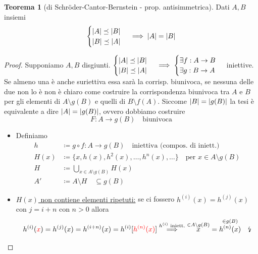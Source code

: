 \documentclass[a4paper,10pt]{article}
\theoremstyle{definition}
\theoremstyle{indentdefinition}
\theoremstyle{indentpostulate}
\theoremstyle{indenttheorem}
\newtheorem{thm}{Teorema}[section]
\theoremstyle{myremark}
\theoremstyle{indentgeneral}
\newenvironment{myboxed} 
{\noindent\begin{lrbox}{\mybox}\begin{minipage}{\textwidth}}
{\end{minipage}\end{lrbox}\fbox{\usebox{\mybox}}}
\begin{document}
\begin{myboxed}
\begin{thm}[di Schröder-Cantor-Bernstein - prop. antisimmetrica]\label{thm-Schröder-Cantor-Bernstein}
    Dati $A,B$ insiemi 
    $$\begin{cases}
        \abs{A}\preceq\abs{B}\\
        \abs{B}\preceq\abs{A}
    \end{cases}\implies \abs{A}=\abs{B}$$
\end{thm}
\end{myboxed}

\begin{proof}
    Supponiamo $A,B$ disgiunti. $\begin{cases}
        \abs{A}\preceq\abs{B}\\
        \abs{B}\preceq\abs{A}
    \end{cases}\implies \begin{cases}
        \exists f:A\to B\\
         \exists g:B\to A
    \end{cases}$ iniettive. Se almeno una è anche suriettiva essa sarà la corrisp. biunivoca, se nessuna delle due non lo è non è chiaro come costruire la corrispondenza biunivoca tra $A$ e $B$ per gli elementi di $A\setminus g(B)$ e quelli di $B\setminus f(A)$. Siccome $\abs{B}=\abs{g(B)}$ la tesi è equivalente a dire $\abs{A}=\abs{g(B)}$, ovvero dobbiamo costruire
    $$F:A\to g(B)\quad\text{biunivoca}$$
    \begin{itemize}
        \item Definiamo
        \begin{align*}
            h&\coloneqq g\circ f: A\to g(B) \quad \text{iniettiva (compos. di iniett.)}\\
            H(x)&\coloneqq\{x,h(x),h^2(x),\dots,h^n(x),\dots\}\quad \text{per }x\in A\setminus g(B)\\
            H&\coloneqq\bigcup_{x\in A\setminus g(B)}H(x) \\
            A'&\coloneqq A\setminus H \quad{\scriptstyle \subseteq g(B)}
        \end{align*}
        \item \underline{$H(x)$ non contiene elementi ripetuti:} se ci fossero $h^{(i)}(x)=h^{(j)}(x)$ con $j=i+n$ con $n>0$ allora
        $$h^{(i)}(\textcolor{red}{x})=h^{(j)}(x)=h^{(i+n)}(x)=h^{(i)}[\textcolor{red}{h^{(n)}(x)}]\overset{h^{(i)}\text{ iniett.}}{\implies}\overset{\in A\setminus g(B)}{x}=\overset{\in g(B)}{h^{(n)}(x)}\quad \text{\lightning}$$

\end{itemize}
\end{proof}
\end{document}
